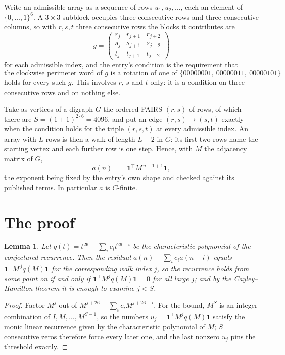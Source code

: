 \documentclass[11pt,a4paper]{article}
\theoremstyle{plain}
\newtheorem{lemma}[theorem]{Lemma}
\theoremstyle{definition}
\begin{document}
Write an admissible array as a sequence of rows $u_1,u_2,\dots$, each an element of
$\{0,\dots,1\}^{6}$. A $3\times3$ subblock occupies three consecutive rows and
three consecutive columns, so with $r,s,t$ three consecutive rows the blocks it
contributes are
\[
g=\begin{pmatrix}r_j&r_{j+1}&r_{j+2}\\ s_j&s_{j+1}&s_{j+2}\\ t_j&t_{j+1}&t_{j+2}\end{pmatrix}
\]
for each admissible index, and the entry's condition is the requirement that
\[
\text{the clockwise perimeter word of }g\text{ is a rotation of one of }\{00000001,\ 00000011,\ 00000101\}
\]
holds for every such $g$. This involves $r$, $s$ and $t$ only: it is a condition on
three consecutive rows and on nothing else.

Take as vertices of a digraph $G$ the ordered PAIRS $(r,s)$ of rows, of which there are
$S=(1+1)^{2\cdot6}=4096$, and put an edge $(r,s)\to(s,t)$ exactly when the condition
holds for the triple $(r,s,t)$ at every admissible index. An array with $L$ rows is then a
walk of length $L-2$ in $G$: its first two rows name the starting vertex and each further
row is one step. Hence, with $M$ the adjacency matrix of $G$,
\[
a(n)\;=\;\,\mathbf{1}^{\!\top}M^{\,n-1+1}\mathbf{1},
\]
the exponent being fixed by the entry's own shape and checked against its published terms.
In particular $a$ is $C$-finite.

\section{The proof}

\begin{lemma}\label{lem:crit}
Let $q(t)=t^{26}-\sum_i c_it^{26-i}$ be the characteristic polynomial of the
conjectured recurrence. Then the residual $a(n)-\sum_ic_ia(n-i)$ equals
$\mathbf{1}^{\!\top}M^{\,j}q(M)\mathbf{1}$ for the corresponding walk index
$j$, so the recurrence holds from some point on if and only if
$\mathbf{1}^{\!\top}M^{j}q(M)\mathbf{1}=0$ for all large $j$; and by the
Cayley--Hamilton theorem it is enough to examine $j<S$.
\end{lemma}

\begin{proof}
Factor $M^{j}$ out of $M^{j+26}-\sum_ic_iM^{j+26-i}$. For the bound, $M^{S}$
is an integer combination of $I,M,\dots,M^{S-1}$, so the numbers
$u_j=\mathbf{1}^{\!\top}M^{j}q(M)\mathbf{1}$ satisfy the monic linear recurrence given by
the characteristic polynomial of $M$; $S$ consecutive zeros therefore force every later one,
and the last nonzero $u_j$ pins the threshold exactly.
\end{proof}
\end{document}

